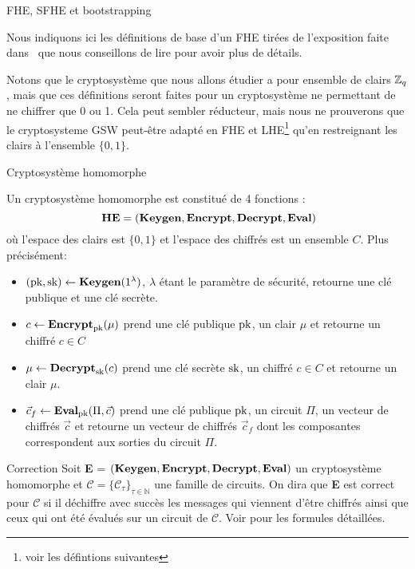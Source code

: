 \begin{section}{FHE, SFHE et bootstrapping}

Nous indiquons ici les définitions de base d'un FHE tirées de 
l'exposition faite dans~\cite{halevi} que nous conseillons 
de lire pour avoir plus de détails.

Notons que le cryptosystème que nous allons étudier a pour ensemble de clairs $\mathbb{Z}_q$, mais que ces définitions seront faites pour un cryptosystème ne permettant de ne chiffrer que 0 ou 1.
Cela peut sembler réducteur, mais nous ne prouverons que le  cryptosysteme
GSW peut-être adapté en FHE et LHE\footnote{voir les défintions suivantes} qu'en restreignant 
les clairs à l'ensemble $\{0, 1\}$.

\begin{definition}{Cryptosystème homomorphe}

Un cryptosystème homomorphe est constitué de 4 fonctions :
\[ \text{\textbf{HE}} = (\Keygen, \Enc, \Dec, \Eval)\]
où l'espace des clairs est $\{0,1\}$ et l'espace des chiffrés est un ensemble $C$.
Plus précisément:
\begin{itemize}
\item $(\text{pk}, \text{sk}) \leftarrow \text{\textbf{Keygen}}(1^\lambda)$, $\lambda$ étant le paramètre de sécurité, retourne une clé publique et une clé secrète.
\item $c \leftarrow \text{\textbf{Encrypt}}_{\text{pk}}(\mu)$ prend une clé publique $\text{pk}$, un clair $\mu$ et retourne un chiffré $c\in C$
\item $\mu \leftarrow \text{\textbf{Decrypt}}_{\text{sk}}(c)$ prend une clé secrète $\text{sk}$, un chiffré $c \in C$ et retourne un clair $\mu$.
\item $\vec{c}_f \leftarrow \text{\textbf{Eval}}_{\text{pk}}(\Pi,\vec{c})$ prend une clé publique
$\text{pk}$, un circuit  $\Pi$, un vecteur de chiffrés $\vec{c}$ et retourne un
vecteur de chiffrés $\vec{c}_f$ dont les composantes correspondent aux sorties du circuit $\Pi$.
\end{itemize}
\end{definition}

\begin{definition}{Correction}
Soit \textbf{E} = $(\text{\textbf{Keygen}}, \text{\textbf{Encrypt}}, \text{\textbf{Decrypt}}, \text{\textbf{Eval}})$ un cryptosystème homomorphe
et  $\mathcal{C} = \{ \mathcal{C}_\tau\}_{\tau \in \mathbb{N}}$ une famille de
circuits.  On dira que \textbf{E} est correct pour $\mathcal{C}$ si il déchiffre avec succès les messages qui viennent d'être chiffrés 
ainsi que ceux qui ont été évalués sur un circuit de $\mathcal{C}$. Voir \cite{halevi} pour les
formules détaillées.
\end{definition}


\end{section}
